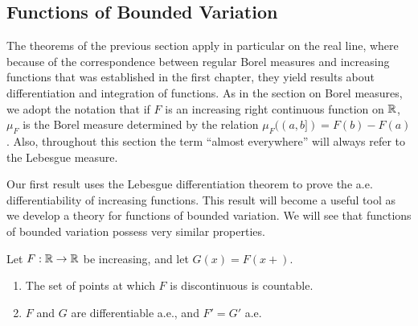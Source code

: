 \documentclass[12pt]{article} %
\begin{document}
\subsection{Functions of Bounded Variation}

The theorems of the previous section apply in particular on the real line, where because of the correspondence between regular Borel measures and increasing functions that was established in the first chapter, they yield results about differentiation and integration of functions. As in the section on Borel measures, we adopt the notation that if $F$ is an increasing right continuous function on $\mathbb{R}$, $\mu_F$ is the Borel measure determined by the relation $\mu_F((a, b]) = F(b) - F(a)$. Also, throughout this section the term ``almost everywhere'' will always refer to the Lebesgue measure.

Our first result uses the Lebesgue differentiation theorem to prove the a.e. differentiability of increasing functions. This result will become a useful tool as we develop a theory for functions of bounded variation. We will see that functions of bounded variation possess very similar properties.

\begin{theorem}\label{thm:3.23}
    Let $F : \mathbb{R} \to \mathbb{R}$ be increasing, and let $G(x) = F(x+)$. \begin{enumerate}
        \item The set of points at which $F$ is discontinuous is countable.
        \item $F$ and $G$ are differentiable a.e., and $F' = G'$ a.e.
    \end{enumerate}
\end{theorem}
\end{document}
